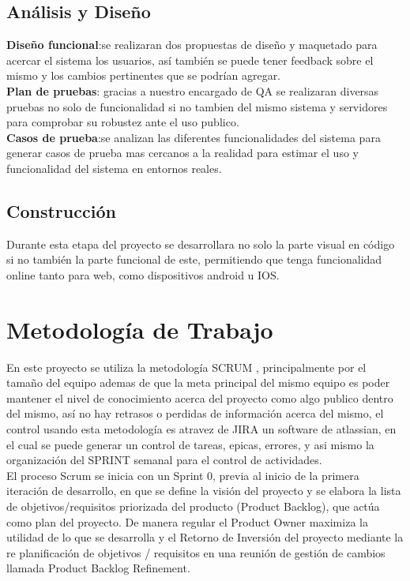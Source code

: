 \documentclass{report}
\begin{document}
			\subsection{Análisis y Diseño}
			\textbf{Diseño funcional}:se realizaran dos propuestas de diseño y maquetado para acercar el sistema los usuarios, así también se puede tener feedback sobre el mismo y los cambios pertinentes que se podrían agregar. \\
			\textbf{Plan de pruebas}: gracias a nuestro encargado de QA se realizaran diversas pruebas no solo de funcionalidad si no tambien del mismo sistema y servidores para comprobar su robustez ante el uso publico. \\
			\textbf{Casos de prueba}:se analizan las diferentes funcionalidades del sistema para generar casos de prueba mas cercanos a la realidad para estimar el uso y funcionalidad del sistema en entornos reales. 
			\subsection{Construcción}
			Durante esta etapa del proyecto se desarrollara no solo la parte visual en código si no también la parte funcional de este, permitiendo que tenga funcionalidad online tanto para web, como dispositivos android u IOS.

		\section{Metodología de Trabajo}
			En este proyecto se utiliza la metodología SCRUM , principalmente por el tamaño del equipo ademas de que la meta principal del mismo equipo es poder mantener el nivel de conocimiento acerca del proyecto como algo publico dentro del mismo, así no hay retrasos o perdidas de información acerca del mismo, el control usando esta metodología es atravez de JIRA un software de atlassian, en el cual se puede generar un control de tareas, epicas, errores, y asi mismo la organización del SPRINT semanal para el control de actividades. \\
			
			El proceso Scrum se inicia con un Sprint 0, previa al inicio de la primera iteración de desarrollo, en que se define la visión del proyecto y se elabora la lista de objetivos/requisitos priorizada del producto (Product Backlog), que actúa como plan del proyecto. De manera regular el Product Owner maximiza la utilidad de lo que se desarrolla y el Retorno de Inversión del proyecto mediante la re planificación de objetivos / requisitos en una reunión de gestión de cambios llamada Product Backlog Refinement.
			
\end{document}
